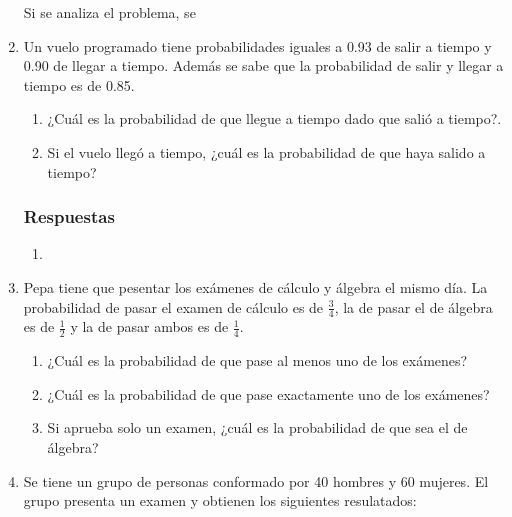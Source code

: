 \documentclass[dvipsnames,a4paper]{book}
\begin{document}
\begin{enumerate}[{Ej1. }]
Si se analiza el problema, se








\item Un vuelo programado tiene probabilidades iguales a {\color{Plum} 0.93 de
    salir a tiempo} y {\color{BlueGreen} 0.90 de llegar a tiempo}. Además se
    sabe que la probabilidad de {\color{Bittersweet} salir y llegar a tiempo es
    de 0.85}.
    \begin{enumerate}[{a) }]
        \item ¿Cuál es la probabilidad de que llegue a tiempo dado que salió a
            tiempo?.
        \item Si el vuelo llegó a tiempo, ¿cuál es la probabilidad de que haya
            salido a tiempo?
    \end{enumerate}

    \subsubsection{Respuestas}
    \begin{enumerate}[{a) }]
        \item
    \end{enumerate}











\item Pepa tiene que pesentar los exámenes de cálculo y álgebra el mismo día. La probabilidad de pasar el examen de cálculo es de {\color{Aquamarine} \(\frac{3}{4}\)}, la de pasar el de álgebra es de {\color{Plum} \(\frac{1}{2}\)} y la de pasar ambos es de  {\color{Thistle} \(\frac{1}{4}\)}.
    \begin{enumerate}[{a) }]
        \item ¿Cuál es la probabilidad de que pase al menos uno de los exámenes?
        \item ¿Cuál es la probabilidad de que pase exactamente uno de los exámenes?
        \item  Si aprueba solo un examen, ¿cuál es la probabilidad de que sea
            el de álgebra?
    \end{enumerate}

\item Se tiene un grupo de personas conformado por {\color{Salmon} 40 hombres} y {\color{BrickRed} 60 mujeres}. El grupo presenta un examen y obtienen los siguientes resulatados:


\end{enumerate}
\end{document}
